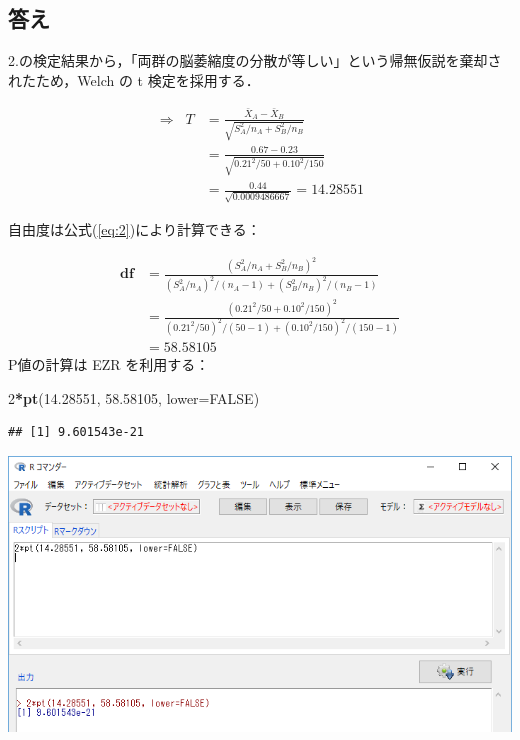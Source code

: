 \documentclass[11pt,]{problemset}
\newenvironment{Shaded}{\begin{snugshade}}{\end{snugshade}}
\newcommand{\DataTypeTok}[1]{\textcolor[rgb]{0.13,0.29,0.53}{#1}}
\newcommand{\DecValTok}[1]{\textcolor[rgb]{0.00,0.00,0.81}{#1}}
\newcommand{\FloatTok}[1]{\textcolor[rgb]{0.00,0.00,0.81}{#1}}
\newcommand{\KeywordTok}[1]{\textcolor[rgb]{0.13,0.29,0.53}{\textbf{#1}}}
\newcommand{\NormalTok}[1]{#1}
\newcommand{\OperatorTok}[1]{\textcolor[rgb]{0.81,0.36,0.00}{\textbf{#1}}}
\newcommand{\OtherTok}[1]{\textcolor[rgb]{0.56,0.35,0.01}{#1}}
\begin{document}
\hypertarget{-2}{%
\subsection{答え}\label{-2}}

2.の検定結果から，「両群の脳萎縮度の分散が等しい」という帰無仮説を棄却されたため，Welch
の t 検定を採用する．

\[
\begin{aligned}
\Rightarrow\;\; T & = \frac{\bar{X}_A - \bar{X}_B}{\sqrt{S^2_A/n_A + S^2_B/n_B}} \\ 
                  & = \frac{0.67 - 0.23}{\sqrt{0.21^2/50 + 0.10^2/150}} \\ 
                  & = \frac{0.44}{\sqrt{0.0009486667}} = 14.28551
\end{aligned}
\]

自由度は公式(\ref{eq:2})により計算できる：

\[
\begin{aligned}
\mathbf{df} & = \frac{(S^2_A/n_A + S^2_B/n_B)^2}{(S_A^2/n_A)^2/(n_A-1)+(S_B^2/n_B)^2/(n_B-1)} \\
            & = \frac{(0.21^2/50 + 0.10^2/150)^2}{(0.21^2/50)^2/(50-1)+(0.10^2/150)^2/(150-1)} \\
            & = 58.58105
\end{aligned}
\] P値の計算は EZR を利用する：

\begin{Shaded}
\begin{Highlighting}[]
\DecValTok{2}\OperatorTok{*}\KeywordTok{pt}\NormalTok{(}\FloatTok{14.28551}\NormalTok{, }\FloatTok{58.58105}\NormalTok{, }\DataTypeTok{lower=}\OtherTok{FALSE}\NormalTok{)}
\end{Highlighting}
\end{Shaded}

\begin{verbatim}
## [1] 9.601543e-21
\end{verbatim}

\begin{center}\includegraphics[width=0.9\linewidth]{pic/tvaluepvalue01} \end{center}
\bigskip
\end{document}
